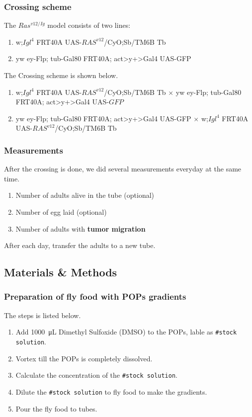 \subsubsection{Crossing scheme}
The $Ras^{v12/Ig}$ model consists of two lines:
\begin{enumerate}
    \item w;$Igl^4$ FRT40A UAS-$RAS^{v12}$/CyO;Sb/TM6B Tb
    \item yw ey-Flp; tub-Gal80 FRT40A; act>y+>Gal4 UAS-GFP
\end{enumerate}
The Crossing scheme is shown below.
\begin{enumerate}
    \item \female w;$Igl^4$ FRT40A UAS-$RAS^{v12}$/CyO;Sb/TM6B Tb $\times$ yw ey-Flp; tub-Gal80 FRT40A; act>y+>Gal4 UAS-$GFP$ \male
    \item \female yw ey-Flp; tub-Gal80 FRT40A; act>y+>Gal4 UAS-GFP $\times$ w;$Igl^4$ FRT40A UAS-$RAS^{v12}$/CyO;Sb/TM6B Tb \male
\end{enumerate}

\subsubsection{Measurements}
After the crossing is done, we did several measurements everyday at the same time.

\begin{enumerate}
    \item Number of adults alive in the tube (optional) 
    \item Number of egg laid (optional)
    \item Number of adults with \textbf{tumor migration}
\end{enumerate}
After each day, transfer the adults to a new tube.

\subsection{Materials \& Methods}

\subsubsection{Preparation of fly food with POPs gradients}
The steps is listed below.
\begin{enumerate}
    \item Add \SI{1000}{\micro\liter} Dimethyl Sulfoxide (DMSO) to the POPs, lable as \texttt{\#stock solution}.
    \item Vortex till the POPs is completely dissolved.
    \item Calculate the concentration of the \texttt{\#stock solution}.
    \item Dilute the \texttt{\#stock solution} to fly food to make the gradients.
    \item Pour the fly food to tubes.
\end{enumerate}

